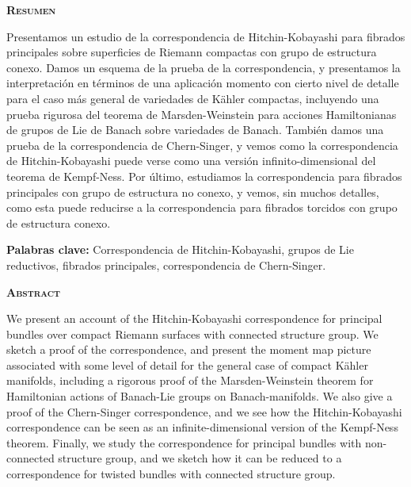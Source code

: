 \documentclass[11 pt, a4paper, twoside]{report}
\theoremstyle{definition}
\begin{document}
\thispagestyle{empty}
\begin{center}
    {\scshape \textbf{Resumen}\par}
\end{center}
    Presentamos un estudio de la correspondencia de Hitchin-Kobayashi para fibrados principales sobre superficies de Riemann compactas con grupo de estructura conexo. Damos un esquema de la prueba de la correspondencia, y presentamos la interpretación en términos de una aplicación momento con cierto nivel de detalle para el caso más general de variedades de Kähler compactas, incluyendo una prueba rigurosa del teorema de Marsden-Weinstein para acciones Hamiltonianas de grupos de Lie de Banach sobre variedades de Banach. También damos una prueba de la correspondencia de Chern-Singer, y vemos como la correspondencia de Hitchin-Kobayashi puede verse como una versión infinito-dimensional del teorema de Kempf-Ness. Por último, estudiamos la correspondencia para fibrados principales con grupo de estructura no conexo, y vemos, sin muchos detalles, como esta puede reducirse a la correspondencia para fibrados torcidos con grupo de estructura conexo.\newline

    \noindent \textbf{Palabras clave:} Correspondencia de Hitchin-Kobayashi, grupos de Lie reductivos, fibrados principales, correspondencia de Chern-Singer.
    \newline \newline \newline 

\begin{center}
    {\scshape \textbf{Abstract}\par}
\end{center}
        We present an account of the Hitchin-Kobayashi correspondence for principal bundles over compact Riemann surfaces with connected structure group. We sketch a proof of the correspondence, and present the moment map picture associated with some level of detail for the general case of compact Kähler manifolds, including a rigorous proof of the Marsden-Weinstein theorem for Hamiltonian actions of Banach-Lie groups on Banach-manifolds. We also give a proof of the Chern-Singer correspondence, and we see how the Hitchin-Kobayashi correspondence can be seen as an infinite-dimensional version of the Kempf-Ness theorem. Finally, we study the correspondence for principal bundles with non-connected structure group, and we sketch how it can be reduced to a correspondence for twisted bundles with connected structure group.\newline
        
\end{document}
